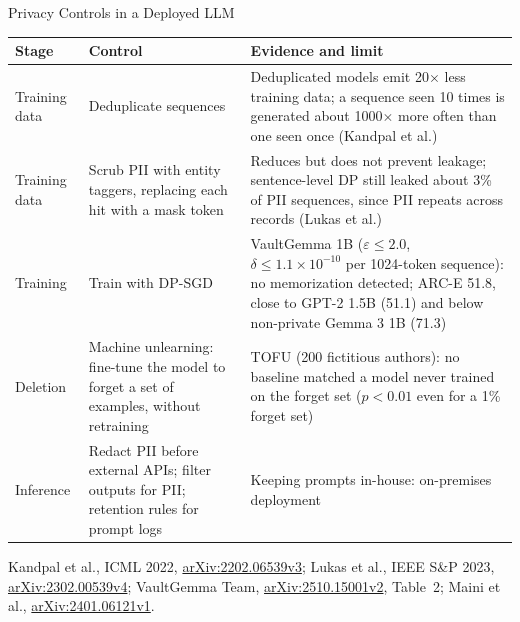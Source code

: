 \begin{frame}{Privacy Controls in a Deployed LLM}
  \centering
  {\scriptsize
  \begin{tabular}{>{\raggedright\arraybackslash}p{1.5cm} >{\raggedright\arraybackslash}p{4.2cm} >{\raggedright\arraybackslash}p{6.4cm}}
    \toprule
    \textbf{Stage} & \textbf{Control} & \textbf{Evidence and limit} \\
    \midrule
    Training data & Deduplicate sequences & Deduplicated models emit 20$\times$ less training data; a sequence seen 10 times is generated about 1000$\times$ more often than one seen once (Kandpal et al.) \\
    \addlinespace[0.2em]
    Training data & Scrub PII with entity taggers, replacing each hit with a mask token & Reduces but does not prevent leakage; sentence-level DP still leaked about 3\% of PII sequences, since PII repeats across records (Lukas et al.) \\
    \addlinespace[0.2em]
    Training & Train with DP-SGD & VaultGemma 1B ($\varepsilon \leq 2.0$, $\delta \leq 1.1 \times 10^{-10}$ per 1024-token sequence): no memorization detected; ARC-E 51.8, close to GPT-2 1.5B (51.1) and below non-private Gemma 3 1B (71.3) \\
    \addlinespace[0.2em]
    Deletion & Machine unlearning: fine-tune the model to forget a set of examples, without retraining & TOFU (200 fictitious authors): no baseline matched a model never trained on the forget set ($p < 0.01$ even for a 1\% forget set) \\
    \addlinespace[0.2em]
    Inference & Redact PII before external APIs; filter outputs for PII; retention rules for prompt logs & Keeping prompts in-house: on-premises deployment \\
    \bottomrule
  \end{tabular}\par}
  \vspace{0.3em}
  {\scriptsize Kandpal et al., ICML 2022, \href{https://arxiv.org/abs/2202.06539v3}{arXiv:2202.06539v3}; Lukas et al., IEEE S\&P 2023, \href{https://arxiv.org/abs/2302.00539v4}{arXiv:2302.00539v4}; VaultGemma Team, \href{https://arxiv.org/abs/2510.15001v2}{arXiv:2510.15001v2}, Table~2; Maini et al., \href{https://arxiv.org/abs/2401.06121v1}{arXiv:2401.06121v1}.}
\end{frame}
